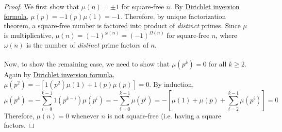 \documentclass{article}
\theoremstyle{definition}
\begin{document}
\begin{proof}
We first show that $\mu(n) = \pm 1$ for square-free $n$. By \hyperref[dirichlet-inv-form]{Dirichlet inversion formula}, $\mu(p) = -1(p) \mu(1) = -1$. Therefore, by unique factorization theorem, a square-free number is factored into product of \emph{distinct} primes. Since $\mu$ is multiplicative, $\mu(n) = (-1)^{\omega(n)} = (-1)^{\Omega(n)}$ for square-free $n$, where $\omega(n)$ is the number of \textit{distinct} prime factors of $n$.
\\
\\
Now, to show the remaining case, we need to show that $\mu(p^k) = 0$ for all $k \geq 2$. Again by \hyperref[dirichlet-inv-form]{Dirichlet inversion formula}, $\mu(p^2) = - \left[ 1(p^2) \mu(1) + 1(p) \mu(p) \right] = 0$. By induction,
$$\mu(p^k) = - \sum_{i = 0}^{k - 1} 1(p^{k - i}) \mu(p^i) = - \sum_{i = 0}^{k - 1} \mu(p^i) = - \left[ \mu(1) + \mu(p) + \sum_{i = 2}^{k - 1} \mu(p^i) \right] = 0$$
Therefore, $\mu(n) = 0$ whenever $n$ is not square-free (i.e. having a square factors.
\end{proof}
\end{document}
